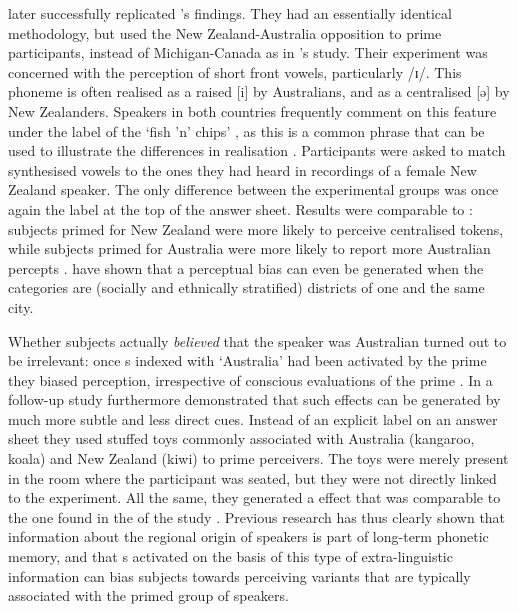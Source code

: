 \textcite{hayetal2006a} later successfully replicated \citeauthor{niedzielski1999}'s findings.
They had an essentially identical methodology, but used the New Zealand-Austra\-lia opposition to prime participants, instead of Michigan-Canada as in \citeauthor{niedzielski1999}'s study.
Their experiment was concerned with the perception of short front vowels, particularly /ɪ/.
This phoneme is often realised as a raised [i] by Australians, and as a centralised [ə] by New Zealanders.
Speakers in both countries frequently comment on this feature under the label of the `fish 'n' chips' , as this is a common phrase that can be used to illustrate the differences in realisation \parencite[cf.][354]{hayetal2006a}.
Participants were asked to match synthesised vowels to the ones they had heard in recordings of a female New Zealand speaker.
The only difference between the experimental groups was once again the label at the top of the answer sheet.
Results were comparable to \citealt{niedzielski1999}: subjects primed for New Zealand were more likely to perceive centralised tokens, while subjects primed for Australia were more likely to report more Australian percepts \parencite[cf.][359--363]{hayetal2006a}.
\textcite{jannedyetal2011} have shown that a perceptual bias can even be generated when the  categories are (socially and ethnically stratified) districts of one and the same city.

\largerpage
Whether subjects actually \emph{believed} that the speaker was Australian turned out to be irrelevant: once s indexed with `Australia' had been activated by the prime they biased perception, irrespective of conscious evaluations of the prime \parencite[cf.][374]{hayetal2006a}.
In a follow-up study \textcite{haydrager2010} furthermore demonstrated that such  effects can be generated by much more subtle and less direct cues.
Instead of an explicit label on an answer sheet they used stuffed toys commonly associated with Australia (kangaroo, koala) and New Zealand (kiwi) to prime perceivers.
The toys were merely present in the room where the participant was seated, but they were not directly linked to the experiment.
All the same, they generated a  effect that was comparable to the one found in the  of the \citeauthor{niedzielski1999} study \parencite[cf.][871--872 and 874--875]{haydrager2010}.
Previous research has thus clearly shown that information about the regional origin of speakers is part of long-term phonetic memory, and that s activated on the basis of this type of extra-linguistic information can bias subjects towards perceiving variants that are typically associated with the primed group of speakers.

